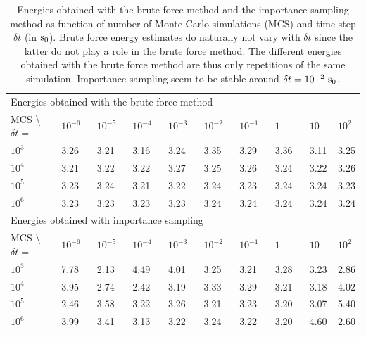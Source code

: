 \begin{table}[h!]
	\centering 
	\begin{tabular}{l @{ } l @{ } l @{ } l @{ } l @{ } l @{ } l @{ } l @{ } l @{ } l }
	\toprule
	\multicolumn{9}{l}{Energies obtained with the brute force method} \\
	MCS \textbackslash  $\delta t = \quad$ & $10^{-6}~~~$ & $10^{-5}~~~$  & $10^{-4}~~~$  & $10^{-3} ~~~$  & $ 10^{-2} ~~~$ & $ 10^{-1} ~~~$  & $ 1 \qquad $  & $ 10 ~~~~$  & $ 10^{2}$ \\
	\midrule
	$10^3$ & 3.26 &  3.21 & 3.16 & 3.24 &  3.35 &  3.29 & 3.36 &  3.11 &  3.25\\
	\shaderow $10^4$ &  3.21 &   3.22 &    3.22 &   3.27 &  3.25 &  3.26 & 3.24 &   3.22 &  3.26 \\
	$10^5$ & 3.23 &    3.24 &   3.21 &  3.22 &  3.24 &  3.23 & 3.24 &   3.24 &  3.23 \\
	\shaderow $10^6$ & 3.23 &   3.23 &   3.23 &  3.23 &   3.24 &  3.24 & 3.24 &   3.24 &  3.24 \\
	\bottomrule
	\toprule
	\multicolumn{9}{l}{Energies obtained with importance sampling} \\
	MCS \textbackslash  $\delta t = \quad$ & $10^{-6}~~~$ & $10^{-5}~~~$  & $10^{-4}~~~$  & $10^{-3} ~~~$  & $ 10^{-2} ~~~$ & $ 10^{-1} ~~~$  & $ 1 ~~~~$  & $ 10 ~~~~$  & $ 10^{2}$ \\
	\midrule
	$10^3$ & 7.78 &   2.13 &   4.49 &  4.01 &  3.25 &  3.21 &   3.28 &  3.23 &  2.86 \\
	\shaderow $10^4$ &  3.95 &   2.74 &   2.42 &   3.19 &  3.33 &  3.29 &   3.21 &   3.18 &   4.02 \\
	$10^5$ & 2.46 &  3.58 &   3.22 &   3.26 &  3.21 &   3.23 &  3.20 &   3.07 &   5.40 \\
	\shaderow $10^6$ & 3.99 &   3.41 &  3.13 &  3.22 &  3.24 &  3.22 &  3.20 &  4.60 &  2.60 \\
	\bottomrule
	\end{tabular}
	\caption{Energies obtained with the brute force method and the importance sampling method as function of number of  		Monte Carlo simulations (MCS) and time step $\delta t$ (in$~\textrm{s}_0$). 
			Brute force energy estimates do naturally not vary with $\delta t$ since the latter do not play a role in the brute force method. 
			The different energies obtained with the brute force method are thus only repetitions of the same simulation.
			Importance sampling seem to be stable around $\delta t = 10^{-2}~\textrm{s}_0$.}
	\label{tab:importance_sampling}
\end{table}


